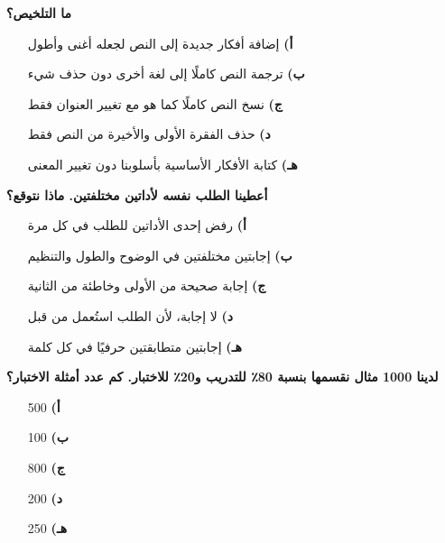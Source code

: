 \documentclass[11pt,a4paper]{article}
\begin{document}
\begin{multicols}{2}
\begin{minipage}{\linewidth}
\hangindent=0.7cm\textbf{ما التلخيص؟}
\begin{itemize}[leftmargin=0.95cm, labelsep=4pt, itemsep=0pt, topsep=2pt, parsep=0pt]
  \item[\textbf{أ)}] إضافة أفكار جديدة إلى النص لجعله أغنى وأطول
  \item[\textbf{ب)}] ترجمة النص كاملًا إلى لغة أخرى دون حذف شيء
  \item[\textbf{ج)}] نسخ النص كاملًا كما هو مع تغيير العنوان فقط
  \item[\textbf{د)}] حذف الفقرة الأولى والأخيرة من النص فقط
  \item[\textbf{هـ)}] كتابة الأفكار الأساسية بأسلوبنا دون تغيير المعنى
\end{itemize}
\end{minipage}\par\vspace{7pt plus 4pt}
\noindent\begin{minipage}{\linewidth}
\hangindent=0.7cm\textbf{أعطينا الطلب نفسه لأداتين مختلفتين. ماذا نتوقع؟}
\begin{itemize}[leftmargin=0.95cm, labelsep=4pt, itemsep=0pt, topsep=2pt, parsep=0pt]
  \item[\textbf{أ)}] رفض إحدى الأداتين للطلب في كل مرة
  \item[\textbf{ب)}] إجابتين مختلفتين في الوضوح والطول والتنظيم
  \item[\textbf{ج)}] إجابة صحيحة من الأولى وخاطئة من الثانية
  \item[\textbf{د)}] لا إجابة، لأن الطلب استُعمل من قبل
  \item[\textbf{هـ)}] إجابتين متطابقتين حرفيًا في كل كلمة
\end{itemize}
\end{minipage}\par\vspace{7pt plus 4pt}
\noindent\begin{minipage}{\linewidth}
\hangindent=0.7cm\textbf{لدينا 1000 مثال نقسمها بنسبة 80٪ للتدريب و20٪ للاختبار. كم عدد أمثلة الاختبار؟}
\begin{itemize}[leftmargin=0.95cm, labelsep=4pt, itemsep=0pt, topsep=2pt, parsep=0pt]
  \item[\textbf{أ)}] 500
  \item[\textbf{ب)}] 100
  \item[\textbf{ج)}] 800
  \item[\textbf{د)}] 200
  \item[\textbf{هـ)}] 250

\end{itemize}
\end{minipage}
\end{multicols}
\end{document}
